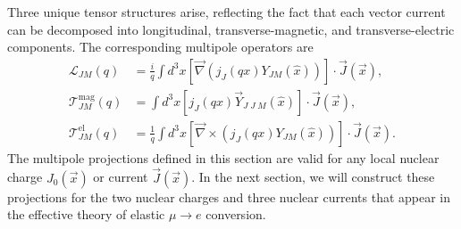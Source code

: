 \documentclass{book}[letterpaper,12pt]
\begin{document}
Three unique tensor structures arise, reflecting the fact that each vector current can be decomposed into longitudinal, transverse-magnetic, and transverse-electric components. The corresponding multipole operators are
\begin{equation}
\begin{split}
\mathcal{L}_{JM}(q)&=\frac{i}{q}\int d^3x \left[\vec{\nabla}\left(j_J(qx)Y_{JM}(\hat{x})\right)\right]\cdot\vec{J}(\vec{x}),\\
\mathcal{T}^{\mathrm{mag}}_{JM}(q)&=\int d^3x\left[j_J(qx)\vec{Y}_{J\;J\;M}(\hat{x})\right]\cdot\vec{J}(\vec{x}),\\
\mathcal{T}^{\mathrm{el}}_{JM}(q)&=\frac{1}{q}\int d^3x\left[\vec{\nabla}\times\left(j_J(qx)Y_{JM}(\hat{x})\right)\right]\cdot\vec{J}(\vec{x}).
\end{split}
\end{equation}
The multipole projections defined in this section are valid for any local nuclear charge $J_0(\vec{x})$ or current $\vec{J}(\vec{x})$. In the next section, we will construct these projections for the two nuclear charges and three nuclear currents that appear in the effective theory of elastic $\mu\rightarrow e$ conversion.

\end{document}
